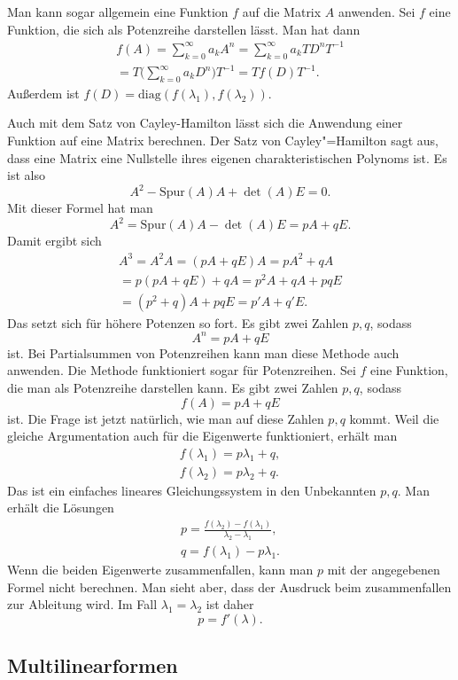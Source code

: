 \documentclass[a4paper,10pt,fleqn,twocolumn,twoside]{article}
\begin{document}
Man kann sogar allgemein eine Funktion \(f\) auf die Matrix \(A\)
anwenden. Sei \(f\) eine Funktion, die sich als Potenzreihe
darstellen lässt. Man hat dann
\begin{gather*}
f(A) = \sum_{k=0}^{\infty} a_kA^n
= \sum_{k=0}^{\infty} a_kTD^nT^{-1}\\
= T\Big(\sum_{k=0}^{\infty} a_kD^n\Big)T^{-1}
= Tf(D)T^{-1}.
\end{gather*}
Außerdem ist \(f(D)=\mathrm{diag}(f(\lambda_1),f(\lambda_2))\).

Auch mit dem Satz von Cayley-Hamilton lässt sich die Anwendung
einer Funktion auf eine Matrix berechnen. Der Satz von
Cayley"=Hamilton sagt aus, dass eine Matrix eine Nullstelle ihres
eigenen charakteristischen Polynoms ist. Es ist also
\[A^2 -\mathrm{Spur}(A)A+\det(A)E=0.\]
Mit dieser Formel hat man
\[A^2 =\mathrm{Spur}(A)A-\det(A)E = pA+qE.\]
Damit ergibt sich
\begin{gather*}
A^3 = A^2A = (pA+qE)A = pA^2+qA\\
= p(pA+qE)+qA = p^{2}A+qA+pqE\\
= (p^2+q)A+pqE = p'A+q'E.
\end{gather*}
Das setzt sich für höhere Potenzen so fort.
Es gibt zwei Zahlen \(p,q\), sodass
\[A^n = pA+qE\]
ist. Bei Partialsummen von Potenzreihen kann man diese Methode
auch anwenden. Die Methode funktioniert sogar für Potenzreihen.
Sei \(f\) eine Funktion, die man als Potenzreihe darstellen kann.
Es gibt zwei Zahlen \(p,q\), sodass
\[f(A) = pA+qE\]
ist. Die Frage ist jetzt natürlich, wie man auf diese Zahlen \(p,q\)
kommt. Weil die gleiche Argumentation auch für die Eigenwerte
funktioniert, erhält man
\begin{gather*}
f(\lambda_1) = p\lambda_1+q,\\
f(\lambda_2) = p\lambda_2+q.
\end{gather*}
Das ist ein einfaches lineares Gleichungssystem in den Unbekannten
\(p,q\). Man erhält die Lösungen
\begin{gather*}
p = \frac{f(\lambda_2)-f(\lambda_1)}{\lambda_2-\lambda_1},\\
q = f(\lambda_1)-p\lambda_1.
\end{gather*}
Wenn die beiden Eigenwerte zusammenfallen, kann man \(p\) mit der
angegebenen Formel nicht berechnen. Man sieht aber, dass der Ausdruck
beim zusammenfallen zur Ableitung wird. Im Fall
\(\lambda_1=\lambda_2\) ist daher
\[p = f'(\lambda).\]

\subsection{Multilinearformen}
\end{document}

